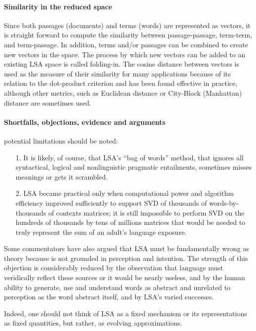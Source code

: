 \paragraph{Similarity in the reduced space}
Since both passages (documents) and terms (words) are represented as vectors, it is straight forward to compute the similarity between passage-passage, term-term, and term-passage. In addition, terms and/or passages can be combined to create new vectors in the space. The process by which new vectors can be added to an existing LSA space is called folding-in. The cosine distance between vectors is used as the measure of their similarity for many applications because of its relation to the dot-product criterion and has been found effective in practice, although other metrics, such as Euclidean distance or City-Block (Manhattan) distance are sometimes used.

\paragraph{Shortfalls, objections, evidence and arguments}
potential limitations should be noted:
\begin{itemize}
\item [1.] It is likely, of course, that LSA's “bag of words” method, that ignores all syntactical, logical and nonlinguistic pragmatic entailments, sometimes misses meanings or gets it scrambled.
\item[2.] LSA became practical only when computational power and algorithm efficiency improved sufficiently to support SVD of thousands of words-by-thousands of contexts matrices; it is still impossible to perform SVD on the hundreds of thousands by tens of millions matrices that would be needed to truly represent the sum of an adult's language exposure.
\end{itemize}
Some commentators have also argued that LSA must be fundamentally wrong as theory because is not grounded in perception and intention. The strength of this objection is considerably reduced by the observation that language must veridically reflect these sources or it would be nearly useless, and by the human ability to generate, use and understand words as abstract and unrelated to perception as the word abstract itself, and by LSA’s varied successes.

Indeed, one should not think of LSA as a fixed mechanism or its representations as
fixed quantities, but rather, as evolving approximations.
